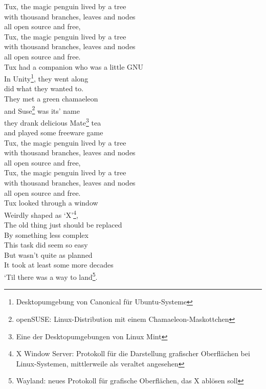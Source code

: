 \documentclass[11pt,a5paper]{article}
\begin{document}
			Tux, the magic penguin lived by a tree \\
			with thousand branches, leaves and nodes \\
			all open source and free, \\
			Tux, the magic penguin lived by a tree \\
			with thousand branches, leaves and nodes \\
			all open source and free. \\
			
			Tux had a companion who was a little GNU \\
			In Unity\footnote{\scriptsize Desktopumgebung von Canonical für Ubuntu-Systeme}, they went along \\
			did what they wanted to. \\
			They met a green chamaeleon \\
			and Suse\footnote{\scriptsize openSUSE: Linux-Distribution mit einem Chamaeleon-Maskottchen} was its’ name \\
			they drank delicious Mate\footnote{\scriptsize Eine der Desktopumgebungen von Linux Mint} tea \\ 
			and played some freeware game \\
			
			Tux, the magic penguin lived by a tree \\
			with thousand branches, leaves and nodes \\
			all open source and free, \\
			Tux, the magic penguin lived by a tree \\
			with thousand branches, leaves and nodes \\
			all open source and free. \\
			
			Tux looked through a window \\
			Weirdly shaped as ‘X’\footnote{\scriptsize X Window Server: Protokoll für die Darstellung grafischer Oberflächen bei Linux-Systemen, mittlerweile als veraltet angesehen}, \\
			The old thing just should be replaced \\ 
			By something less complex \\
			This task did seem so easy \\
			But wasn’t quite as planned \\
			It took at least some more decades \\
			‘Til there was a way to land\footnote{\scriptsize Wayland: neues Protokoll für grafische Oberflächen, das X ablösen soll}. \\
			
\end{document}
